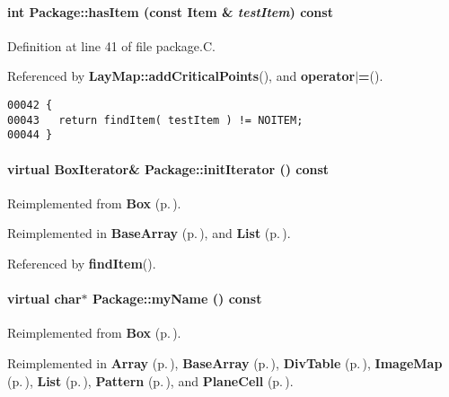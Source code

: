 \paragraph{\setlength{\rightskip}{0pt plus 5cm}int Package::has\-Item (const {\bf Item} \& {\em test\-Item}) const\hspace{0.3cm}{\tt  [virtual]}}\hfill



Definition at line 41 of file package.C.

Referenced by {\bf Lay\-Map::add\-Critical\-Points}(), and {\bf operator$|$=}().\small\begin{verbatim}00042 {
00043   return findItem( testItem ) != NOITEM;
00044 }
\end{verbatim}\normalsize 
\label{Package_a6}
\paragraph{\setlength{\rightskip}{0pt plus 5cm}virtual {\bf Box\-Iterator}\& Package::init\-Iterator () const\hspace{0.3cm}{\tt  [pure virtual]}}\hfill



Reimplemented from {\bf Box} {\rm (p.\,\pageref{Box_a3})}.

Reimplemented in {\bf Base\-Array} {\rm (p.\,\pageref{BaseArray_a5})}, and {\bf List} {\rm (p.\,\pageref{List_a8})}.

Referenced by {\bf find\-Item}().\label{Package_a9}
\paragraph{\setlength{\rightskip}{0pt plus 5cm}virtual char$\ast$ Package::my\-Name () const\hspace{0.3cm}{\tt  [pure virtual]}}\hfill



Reimplemented from {\bf Box} {\rm (p.\,\pageref{Box_a5})}.

Reimplemented in {\bf Array} {\rm (p.\,\pageref{Array_a6})}, {\bf Base\-Array} {\rm (p.\,\pageref{BaseArray_a11})}, {\bf Div\-Table} {\rm (p.\,\pageref{DivTable_a3})}, {\bf Image\-Map} {\rm (p.\,\pageref{ImageMap_a3})}, {\bf List} {\rm (p.\,\pageref{List_a7})}, {\bf Pattern} {\rm (p.\,\pageref{Pattern_a3})}, and {\bf Plane\-Cell} {\rm (p.\,\pageref{PlaneCell_a3})}.\label{Package_a8}
